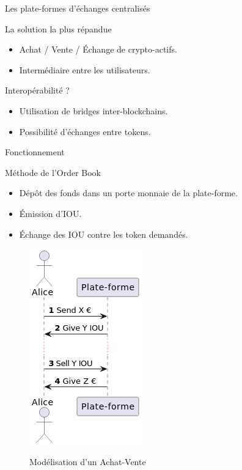 \begin{frame}{Les plate-formes d'échanges centralisés}
    \begin{block}{La solution la plus répandue}
        \begin{itemize}
            \item Achat / Vente / Échange de crypto-actifs.
            \item Intermédiaire entre les utilisateurs.
        \end{itemize}
    \end{block}
    \pause
    \begin{block}{Interopérabilité ?}
        \begin{itemize}
            \item Utilisation de bridges inter-blockchains.
            \item Possibilité d'échanges entre tokens.
        \end{itemize}
    \end{block}
\end{frame}

\begin{frame}{Fonctionnement}    
    \begin{block}{Méthode de l'Order Book}
        \begin{itemize}
            \item Dépôt des fonds dans un porte monnaie de la plate-forme. 
            \item Émission d'IOU\footnotemark.
            \item Échange des IOU contre les token demandés.
        \end{itemize}
    \end{block}
    \begin{figure}
        \centering
        \includegraphics[scale = 0.45]{centralisation/img_plateformes/achat-vente.png}
        \label{fig:Order}
        \caption{Modélisation d'un Achat-Vente}
    \end{figure}
\end{frame}

